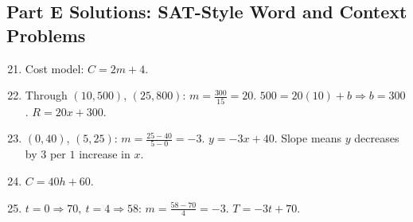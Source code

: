 \documentclass[14pt]{extarticle}
\begin{document}
\subsection*{Part E Solutions: SAT-Style Word and Context Problems}
\begin{enumerate}
    \setcounter{enumi}{20}
    \item Cost model: \(\boxed{C=2m+4}\).
    \item Through \((10,500)\), \((25,800)\): \(m=\frac{300}{15}=20\). \(500=20(10)+b\Rightarrow b=300\). \(\boxed{R=20x+300}\).
    \item \((0,40)\), \((5,25)\): \(m=\frac{25-40}{5-0}=-3\). \(\boxed{y=-3x+40}\). Slope means \(y\) decreases by \(3\) per \(1\) increase in \(x\).
    \item \(\boxed{C=40h+60}\).
    \item \(t=0\Rightarrow 70,\ t=4\Rightarrow58\): \(m=\frac{58-70}{4}=-3\). \(\boxed{T=-3t+70}\).
\end{enumerate}



\end{document}
